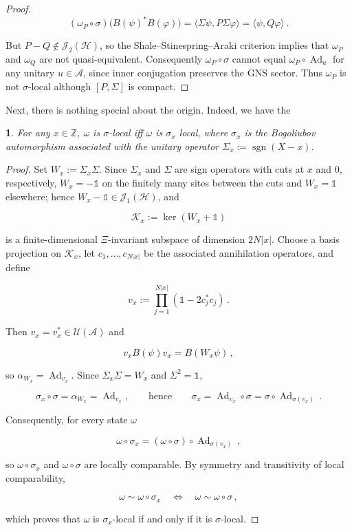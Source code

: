 \documentclass[a4paper,10pt]{article}
\numberwithin{equation}{section}
\theoremstyle{plain}
\theoremstyle{plain}
\newtheorem{lem}[lem]{\protect\lemmaname}
\theoremstyle{plain}
\theoremstyle{plain}
\theoremstyle{plain}
\theoremstyle{remark}
\theoremstyle{definition}
\providecommand{\lemmaname}{Lemma}
\newcommand{\ZZ}{\mathbb{Z}}
\newcommand{\calA}{\mathcal{A}}
\newcommand{\calU}{\mathcal{U}}
\newcommand{\calH}{\mathcal{H}}
\newcommand{\calK}{\mathcal{K}}
\newcommand{\calJ}{\mathcal{J}}
\newcommand{\Ad}[1]{\operatorname{Ad}_{#1}}
\newcommand{\Id}{\mathds{1}}
\newcommand{\sgn}{\operatorname{sgn}}
\begin{document}
\begin{proof}
$$
(\omega_P\circ\sigma)\bigl(B(\psi)^*B(\varphi)\bigr)
=\langle\Sigma\psi,P\Sigma\varphi\rangle
=\langle\psi,Q\varphi\rangle\,.
$$

But \(P-Q\notin\mathcal J_2(\calH)\), so the Shale--Stinespring--Araki criterion implies that \(\omega_P\) and \(\omega_Q\) are not quasi-equivalent. Consequently \(\omega_P\circ\sigma\) cannot equal \(\omega_P\circ\operatorname{Ad}_u\) for any unitary \(u\in\calA\), since inner conjugation preserves the GNS sector. Thus \(\omega_P\) is not \(\sigma\)-local although \([P,\Sigma]\) is compact.
\end{proof}

Next, there is nothing special about the origin. Indeed, we have the 
\begin{lem}
For any $x\in\ZZ$, $\omega$ is $\sigma$-local iff $\omega$ is $\sigma_x$ local, where $\sigma_x$ is the Bogoliubov automorphism associated with the unitary operator $\Sigma_x:=\sgn(X-x)$.
\end{lem}
\begin{proof}
Set \(W_x:=\Sigma_x\Sigma\). Since \(\Sigma_x\) and \(\Sigma\) are sign operators with cuts at \(x\) and \(0\), respectively, \(W_x=-\Id\) on the finitely many sites between the cuts and \(W_x=\Id\) elsewhere; hence \(W_x-\Id\in\calJ_1(\calH)\), and

$$
\calK_x:=\ker(W_x+\Id)
$$

is a finite-dimensional \(\Xi\)-invariant subspace of dimension \(2N|x|\). Choose a basis projection on \(\calK_x\), let \(c_1,\ldots,c_{N|x|}\) be the associated annihilation operators, and define

$$
v_x:=\prod_{j=1}^{N|x|}(\Id-2c_j^*c_j)\,.
$$

Then \(v_x=v_x^*\in\calU(\calA)\) and

$$
v_xB(\psi)v_x=B(W_x\psi)\, ,
$$

so \(\alpha_{W_x}=\Ad{v_x}\). Since \(\Sigma_x\Sigma=W_x\) and \(\Sigma^2=\Id\),

$$
\sigma_x\circ\sigma=\alpha_{W_x}=\Ad{v_x},
\qquad\text{hence}\qquad
\sigma_x=\Ad{v_x}\circ\sigma
       =\sigma\circ\Ad{\sigma(v_x)}\,.
$$

Consequently, for every state \(\omega\)

$$
\omega\circ\sigma_x
=(\omega\circ\sigma)\circ\Ad{\sigma(v_x)}\, ,
$$

so \(\omega\circ\sigma_x\) and \(\omega\circ\sigma\) are locally comparable. By symmetry and transitivity of local comparability,

$$
\omega\sim\omega\circ\sigma_x
\quad\Longleftrightarrow\quad
\omega\sim\omega\circ\sigma\, ,
$$

which proves that \(\omega\) is \(\sigma_x\)-local if and only if it is \(\sigma\)-local.
\end{proof}
\end{document}
